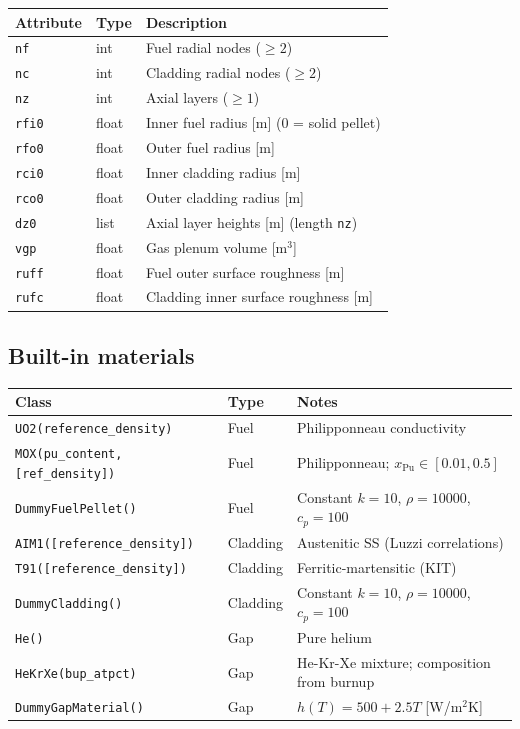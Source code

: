 \documentclass[11pt,a4paper]{article}
\begin{document}
\begin{center}
\begin{tabular}{lll}
\toprule
Attribute & Type & Description \\
\midrule
\texttt{nf}   & int & Fuel radial nodes ($\ge 2$) \\
\texttt{nc}   & int & Cladding radial nodes ($\ge 2$) \\
\texttt{nz}   & int & Axial layers ($\ge 1$) \\
\texttt{rfi0} & float & Inner fuel radius [m] (0 = solid pellet) \\
\texttt{rfo0} & float & Outer fuel radius [m] \\
\texttt{rci0} & float & Inner cladding radius [m] \\
\texttt{rco0} & float & Outer cladding radius [m] \\
\texttt{dz0}  & list  & Axial layer heights [m] (length \texttt{nz}) \\
\texttt{vgp}  & float & Gas plenum volume [m$^3$] \\
\texttt{ruff} & float & Fuel outer surface roughness [m] \\
\texttt{rufc} & float & Cladding inner surface roughness [m] \\
\bottomrule
\end{tabular}
\end{center}

\subsection{Built-in materials}

\begin{center}
\begin{tabular}{lll}
\toprule
Class & Type & Notes \\
\midrule
\texttt{UO2(reference\_density)}         & Fuel    & Philipponneau conductivity \\
\texttt{MOX(pu\_content, [ref\_density])} & Fuel    & Philipponneau; $x_\text{Pu} \in [0.01,0.5]$ \\
\texttt{DummyFuelPellet()}               & Fuel    & Constant $k=10$, $\rho=10000$, $c_p=100$ \\
\texttt{AIM1([reference\_density])}       & Cladding & Austenitic SS (Luzzi correlations) \\
\texttt{T91([reference\_density])}        & Cladding & Ferritic-martensitic (KIT) \\
\texttt{DummyCladding()}                  & Cladding & Constant $k=10$, $\rho=10000$, $c_p=100$ \\
\texttt{He()}                             & Gap      & Pure helium \\
\texttt{HeKrXe(bup\_atpct)}               & Gap      & He-Kr-Xe mixture; composition from burnup \\
\texttt{DummyGapMaterial()}               & Gap      & $h(T) = 500 + 2.5T$ [W/m$^2$K] \\
\bottomrule
\end{tabular}
\end{center}
\end{document}
